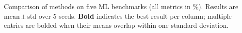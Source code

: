 \caption{Comparison of methods on five ML benchmarks (all metrics in \%). Results are mean\,$\pm$\,std over 5 seeds. \textbf{Bold} indicates the best result per column; multiple entries are bolded when their means overlap within one standard deviation.}
